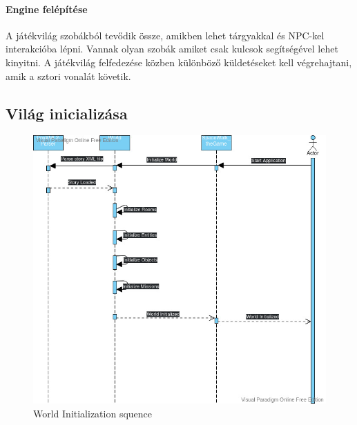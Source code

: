 \documentclass{scrarticle}
\begin{document}
\paragraph{Engine felépítése}
A játékvilág szobákból tevődik össze, amikben lehet tárgyakkal és NPC-kel interakcióba lépni. Vannak olyan szobák amiket csak kulcsok segítségével lehet kinyitni. A játékvilág felfedezése közben különböző küldetéseket kell végrehajtani, amik a sztori vonalát követik.

\subsection{Világ inicializása}
\begin{figure}[H]
    \includegraphics[width=0.95\columnwidth]{World_Initialization_Sequence.jpg}
    \caption{World Initialization squence}\label{fig:4}
\end{figure}
\end{document}
